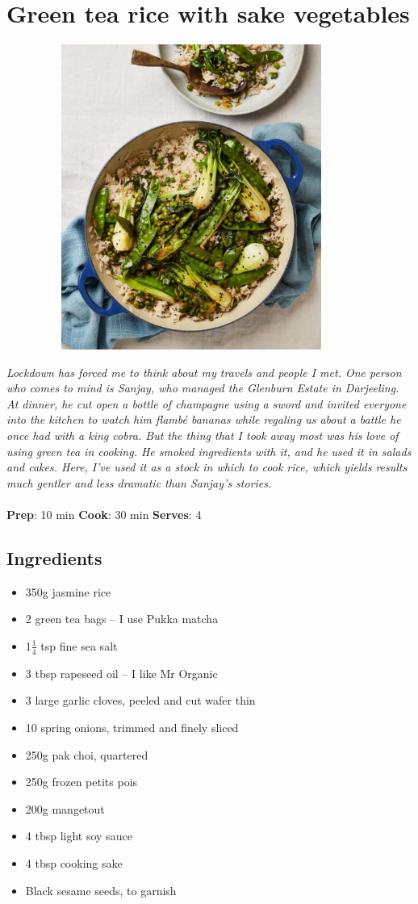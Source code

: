 \documentclass{book}
\begin{document}
\section{Green tea rice with sake vegetables}
\begin{figure}
\centering\includegraphics[width=10cm,height=10cm,keepaspectratio]{Recipe_Pictures/Green_tea_rice_with_sake_vegetables.png}
\end{figure}
\emph{Lockdown has forced me to think about my travels and people I met. One person who comes to mind is Sanjay, who managed the Glenburn Estate in Darjeeling. At dinner, he cut open a bottle of champagne using a sword and invited everyone into the kitchen to watch him flambé bananas while regaling us about a battle he once had with a king cobra. But the thing that I took away most was his love of using green tea in cooking. He smoked ingredients with it, and he used it in salads and cakes. Here, I’ve used it as a stock in which to cook rice, which yields results much gentler and less dramatic than Sanjay’s stories.}\\\\ 
\textbf{Prep}: 10 min
\textbf{Cook}: 30 min
\textbf{Serves}: 4
\subsection*{Ingredients}
\begin{itemize}
\item 350g jasmine rice
\item 2 green tea bags – I use Pukka matcha
\item 1$\frac{1}{4}$ tsp fine sea salt
\item 3 tbsp rapeseed oil – I like Mr Organic
\item 3 large garlic cloves, peeled and cut wafer thin
\item 10 spring onions, trimmed and finely sliced
\item 250g pak choi, quartered
\item 250g frozen petits pois
\item 200g mangetout
\item 4 tbsp light soy sauce
\item 4 tbsp cooking sake
\item Black sesame seeds, to garnish
\end{itemize}
\end{document}
